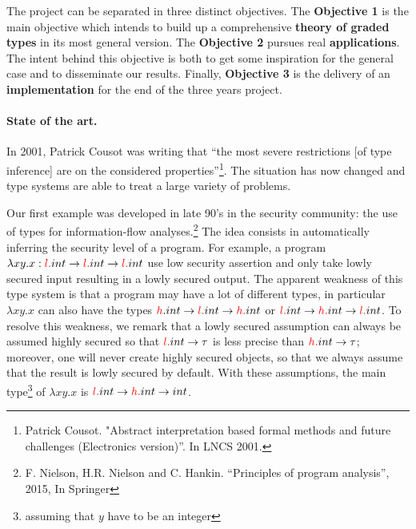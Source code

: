 \documentclass{article}[11pt]
\newcommand\rta{\rightarrow}
\begin{document}
The project can be separated in three distinct objectives. The {\bf Objective 1} is the main objective which intends to build up a comprehensive {\bf theory of graded types} in its most general version. The {\bf Objective 2} pursues real {\bf applications}. %
The intent behind this objective is both to get some inspiration for the general case and to disseminate our results. Finally, {\bf Objective 3} is the delivery of an {\bf implementation} for the end of the three years project.


\paragraph{State of the art.}


In 2001, Patrick Cousot was writing that ``the most severe restrictions [of type inference] are on the considered properties''\footnote{Patrick Cousot. "Abstract interpretation based formal methods and future challenges (Electronics version)''. In LNCS 2001.}. The situation has now changed and type systems are able to treat a large variety of problems.

Our first example was developed in late 90's in the security community: the use of types for information-flow analyses.\footnote{F. Nielson, H.R. Nielson and C. Hankin. ``Principles of program analysis'', 2015, In Springer} The idea consists in automatically inferring the security level of a program. For example, a program $\lambda xy.x:{\color{red}l.}int\rta {\color{red}l.}int\rta {\color{red}l.}int$ use low security assertion and only take lowly secured input resulting in a lowly secured output. %
The apparent weakness of this type system is that a program may have a lot of different types, in particular $\lambda xy.x$ can also have the types ${\color{red}h}.int\rta {\color{red}l.}int\rta {\color{red}h.}int$ or ${\color{red}l.}int\rta {\color{red}h.}int\rta {\color{red}l.}int$. To resolve this weakness, we remark that a lowly secured assumption can always be assumed highly secured so that ${\color{red}l.}int\rta \tau$ is less precise than ${\color{red}h.}int\rta\tau$; moreover, one will never create highly secured objects, so that we always assume that the result is lowly secured by default. With these assumptions, the main type\footnote{assuming that $y$ have to be an integer} of $\lambda xy.x$ is ${\color{red}l.}int\rta {\color{red}h.}int\rta int$.
\end{document}
